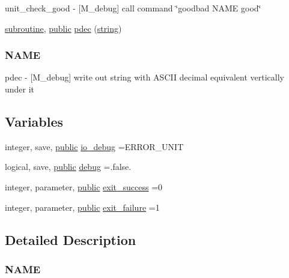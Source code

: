\begin{DoxyCompactItemize}
\begin{DoxyCompactList}
unit\+\_\+check\+\_\+good -\/ \mbox{[}M\+\_\+debug\mbox{]} call command \char`\"{}goodbad N\+A\+M\+E good\char`\"{} \end{DoxyCompactList}\item 
\hyperlink{M__stopwatch_83_8txt_acfbcff50169d691ff02d4a123ed70482}{subroutine}, \hyperlink{M__stopwatch_83_8txt_a2f74811300c361e53b430611a7d1769f}{public} \hyperlink{namespacem__debug_a9b456606b4c555ed2e1e453aa9c872cb}{pdec} (\hyperlink{what__overview_81_8txt_a74cb7e955273b9f9157b4f0c18a38849}{string})
\begin{DoxyCompactList}\small\item\em \subsubsection*{N\+A\+ME}

pdec -\/ \mbox{[}M\+\_\+debug\mbox{]} write out string with A\+S\+C\+II decimal equivalent vertically under it \end{DoxyCompactList}\end{DoxyCompactItemize}
\subsection*{Variables}
\begin{DoxyCompactItemize}
\item 
integer, save, \hyperlink{M__stopwatch_83_8txt_a2f74811300c361e53b430611a7d1769f}{public} \hyperlink{namespacem__debug_ab9d95afd83b30688892f4c818ee8c312}{io\+\_\+debug} =E\+R\+R\+O\+R\+\_\+\+U\+N\+IT
\item 
logical, save, \hyperlink{M__stopwatch_83_8txt_a2f74811300c361e53b430611a7d1769f}{public} \hyperlink{namespacem__debug_aa13827e130b8e8bde8a8597e3d3faa0c}{debug} =.false.
\item 
integer, parameter, \hyperlink{M__stopwatch_83_8txt_a2f74811300c361e53b430611a7d1769f}{public} \hyperlink{namespacem__debug_a9f9aab455ab97238c80d66dd9ed65a7d}{exit\+\_\+success} =0
\item 
integer, parameter, \hyperlink{M__stopwatch_83_8txt_a2f74811300c361e53b430611a7d1769f}{public} \hyperlink{namespacem__debug_a884bfce2d57734eb9f07e8a99d4ffaeb}{exit\+\_\+failure} =1
\end{DoxyCompactItemize}


\subsection{Detailed Description}
\subsubsection*{N\+A\+ME}

